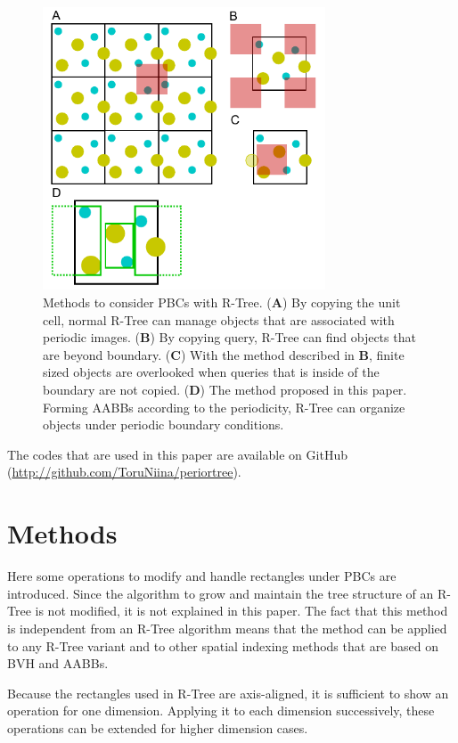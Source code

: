\documentclass[10pt,letterpaper,twocolumn]{article}
\begin{document}
\begin{figure}[hbt]
    \includegraphics[width=8.4cm, bb=6 3 220 224]{fig1.eps}
    \caption{Methods to consider PBCs with R-Tree.
    (\textbf{A})
    By copying the unit cell, normal R-Tree can manage objects that are
    associated with periodic images.
    (\textbf{B})
    By copying query, R-Tree can find objects that are beyond boundary.
    (\textbf{C})
    With the method described in \textbf{B}, finite sized objects are
    overlooked when queries that is inside of the boundary are not copied.
    (\textbf{D})
    The method proposed in this paper. Forming AABBs according to
    the periodicity, R-Tree can organize objects under periodic boundary
    conditions.}
    \label{fig-method-rtree-pbc}
\end{figure}

The codes that are used in this paper are available on GitHub
(\url{http://github.com/ToruNiina/periortree}).

\section*{Methods}

Here some operations to modify and handle rectangles under PBCs are introduced.
Since the algorithm to grow and maintain the tree structure of an R-Tree is not
modified, it is not explained in this paper.
The fact that this method is independent from an R-Tree algorithm means that
the method can be applied to any R-Tree variant and to other spatial indexing
methods that are based on BVH and AABBs.

Because the rectangles used in R-Tree are axis-aligned, it is sufficient to show
an operation for one dimension. Applying it to each dimension successively,
these operations can be extended for higher dimension cases.
\end{document}
